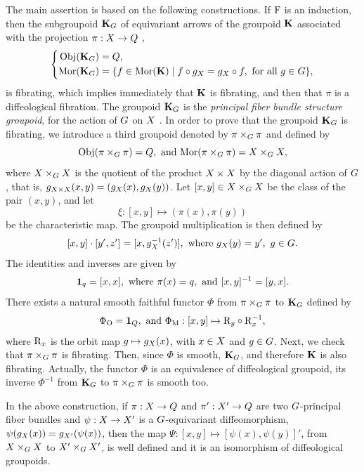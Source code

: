 \begin{article}
   The main assertion is based on the following constructions.
  If $\mathrm{F}$ is an induction,
  then the subgroupoid ${\mathbf K}_G$ of equivariant arrows of the groupoid ${\mathbf K}$ associated with the projection $\pi : X \to Q$ ,
  $$%
  \left\{
  \begin{aligned}
    \Obj(\KK_\G) & = \Q, \\
    \Mor(\KK_\G) & = \{ f \in \Mor(\KK) \mid f \circ g_\X = g_\X \circ f, \text{ for all } g \in \G\},
  \end{aligned}
  \right.
  $$%
  is fibrating,
  which implies immediately that ${\mathbf K}$ is fibrating,
  and then that $\pi$ is a diffeological fibration.
  The groupoid ${\mathbf K}_G$ is the {\em principal fiber bundle structure groupoid},
  for the action of $G$ on $X$ .
  In order to prove that the groupoid ${\mathbf K}_G$ is fibrating,
  we introduce a third groupoid denoted by $\pi \times_G \pi$ and defined by
  $$%
  \Obj(\pi \times_\G \pi) = \Q, \text{ and } \Mor(\pi \times_\G \pi) = \X \times_\G \X,
  $$%
  where $X \times_G X$ is the quotient of the product $X \times X$ by the diagonal action of $G$,
  that is,
  $g_{X \times X}(x,y) = (g_X(x), g_X(y))$.
  Let $[x,y] \in X \times_G X$ be the class of the pair $(x,y)$,
  and let
  $$%
  \xi : [x,y] \mapsto (\pi(x), \pi(y))
  $$%
  be the characteristic map.
  The groupoid multiplication is then defined by
  $$%
  [x,y] \cdot [y',z'] = [x,g_\X^{-1}(z')], \text{ where }
  g_\X(y) = y',\ g\in \G.
  $$%
  The identities and inverses are given by
  $$%
  \id_q = [x,x], \text{ where } \pi(x) = q, \text{ and } [x,y]^{-1} = [y,x].
  $$%
  There exists a natural smooth faithful functor $\Phi$ from $\pi \times_G \pi$ to ${\mathbf K}_G$ defined by
  $$%
  \Phi_\eO = \id_\Q, \text{ and } \Phi_\eM : [x,y] \mapsto \eR_y \circ \eR_x^{-1},
  $$%
  where $\mathrm{R}_x$ is the orbit map $g \mapsto g_X(x)$,
  with $x \in X$ and $g \in G$.
  Next,
  we check that $\pi \times_G \pi$ is fibrating.
  Then,
  since $\Phi$ is smooth,
  ${\mathbf K}_G$,
  and therefore ${\mathbf K}$ is also fibrating.
  Actually,
  the functor $\Phi$ is an equivalence of diffeological groupoid,
  its inverse $\Phi^{-1}$ from ${\mathbf K}_G$ to $\pi \times_G \pi$ is smooth too.
  
   In the above construction,
  if $\pi : X \to Q$ and $\pi' : X' \to Q$ are two $G$-principal fiber bundles and $\psi : X \to X'$ is a $G$-equivariant diffeomorphism,
  $\psi(g_X(x)) = g_{X'}(\psi(x))$,
  then the map $\Psi: [x,y] \mapsto [\psi(x),\psi(y)]'$,
  from $X \times_G X$ to $X' \times_G X'$,
  is well defined and it is an isomorphism of diffeological groupoids.
\end{article} %

